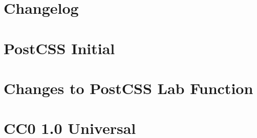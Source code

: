 \documentclass[twoside]{book}
\newcommand{\+}{\discretionary{\mbox{\scriptsize$\hookleftarrow$}}{}{}}
\begin{document}
\chapter{Changelog}
\label{md__c___users_vaishnavi_jadhav__desktop__developer_code_mean_stack_example_client_node_modules_paccbad04ead6077880bd757f4120bb49}

\chapter{Post\+CSS Initial}
\label{md__c___users_vaishnavi_jadhav__desktop__developer_code_mean_stack_example_client_node_modules_postcss_initial__r_e_a_d_m_e}

\chapter{Changes to Post\+CSS Lab Function}
\label{md__c___users_vaishnavi_jadhav__desktop__developer_code_mean_stack_example_client_node_modules_p60d09be19d3145e96d8fd7d85b25b915}

\chapter{CC0 1.0 Universal}
\label{md__c___users_vaishnavi_jadhav__desktop__developer_code_mean_stack_example_client_node_modules_p8db2cb6c213e1456ebe7c90d66389a2f}

\end{document}
